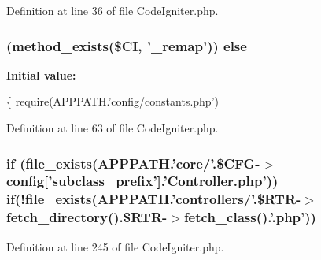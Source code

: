 Definition at line 36 of file Code\-Igniter.\-php.

\subsubsection[{else}]{ (method\-\_\-exists(\$C\-I, '\-\_\-remap')) else}\label{_code_igniter_8php_a92382071610da06a8cb62a44c4530e10}
{\bfseries Initial value\-:}
\begin{DoxyCode}
\{
        require(APPPATH.\textcolor{stringliteral}{'config/constants.php'})
\end{DoxyCode}


Definition at line 63 of file Code\-Igniter.\-php.

\subsubsection[{if}]{\setlength{\rightskip}{0pt plus 5cm}if (file\-\_\-exists(A\-P\-P\-P\-A\-T\-H.'core/'.\$C\-F\-G-\/$>$config['subclass\-\_\-prefix'].'Controller.\-php')) if(!file\-\_\-exists(A\-P\-P\-P\-A\-T\-H.'controllers/'.\$R\-T\-R-\/$>$fetch\-\_\-directory().\$R\-T\-R-\/$>$fetch\-\_\-class().'.php'))}\label{_code_igniter_8php_a8d119d888af4f356541728c61143967b}


Definition at line 245 of file Code\-Igniter.\-php.

